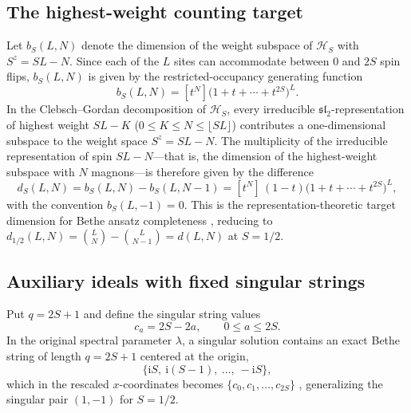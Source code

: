 \documentclass[11pt]{article}
\theoremstyle{definition}
\newcommand{\ii}{\mathrm{i}}
\begin{document}
\subsection{The highest-weight counting target}

Let $b_S(L,N)$ denote the dimension of the weight subspace of $\mathcal{H}_S$ with $S^z=SL-N$. Since each of the $L$ sites can accommodate between $0$ and $2S$ spin flips, $b_S(L,N)$ is given by the restricted-occupancy generating function
\[
 b_S(L,N)=[t^N]\bigl(1+t+\cdots+t^{2S}\bigr)^L.
\]
In the Clebsch--Gordan decomposition of $\mathcal{H}_S$, every irreducible $\mathfrak{sl}_2$-representation of highest weight $SL-K$ ($0\le K\le N\le\lfloor SL\rfloor$) contributes a one-dimensional subspace to the weight space $S^z=SL-N$.
The multiplicity of the irreducible representation of spin $SL-N$---that is, the dimension of the highest-weight subspace with $N$ magnons---is therefore given by the difference
\begin{equation}\label{eq:spin-S-target}
 \boxed{d_S(L,N)=b_S(L,N)-b_S(L,N-1)
 =[t^N]\,(1-t)\bigl(1+t+\cdots+t^{2S}\bigr)^L,}
\end{equation}
with the convention $b_S(L,-1)=0$. This is the representation-theoretic target dimension
for Bethe ansatz completeness \cite[Section~2]{HNS2014,HJJ2024}, reducing to
$d_{1/2}(L,N)=\binom{L}{N}-\binom{L}{N-1}=d(L,N)$ at $S=1/2$.

\subsection{Auxiliary ideals with fixed singular strings}

Put $q=2S+1$ and define the singular string values
\[
 c_a=2S-2a,\qquad 0\le a\le 2S.
\]
In the original spectral parameter $\lambda$, a singular solution contains an exact Bethe string of length $q=2S+1$ centered at the origin,
\[
 \{\ii S,\ \ii(S-1),\ \ldots,\ -\ii S\},
\]
which in the rescaled $x$-coordinates becomes $\{c_0,c_1,\ldots,c_{2S}\}$ \cite{HNS2014,HJJ2024}, generalizing the singular pair $(1,-1)$ for $S=1/2$.
\end{document}
